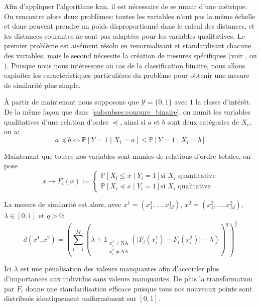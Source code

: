 Afin d'appliquer l'algorithme \ac{knn}, il est nécessaire de se munir d'une métrique. On rencontre alors deux problèmes: toutes les variables n'ont pas la même échelle et donc peuvent prendre un poids disproportionné dans le calcul des distances, et les distances courantes ne sont pas adaptées pour les variables qualitatives. Le premier problème est aisément résolu en renormalisant et standardisant chacune des variables, mais le second nécessite la création de mesures spécifiques (voir \citet{Wilson1997}, \citet{Lumijarvi2004} ou \citet{Rodriguez2008}). Puisque nous nous intéressons au cas de la classification binaire, nous allons exploiter les caractéristiques particulières du problème pour obtenir une mesure de similarité plus simple.

À partir de maintenant nous supposons que $\mathcal{Y} = \{0,1\}$ avec $1$ la classe d'intérêt. De la même façon que dans~\ref{subsubsec:coupure_binaire}, on munit les variables qualitatives d'une relation d'ordre $\preceq$, ainsi si $a$ et $b$ sont deux catégories de $X_i$, on a:
\begin{equation*}
    a \preceq b \Leftrightarrow \mathbb{P} \left[ Y = 1 \mid X_i = a \right] \leq \mathbb{P} \left[ Y = 1 \mid X_i = b \right]
\end{equation*}

Maintenant que toutes nos variables sont munies de relations d'ordre totales, on pose
\begin{equation*}
    x \rightarrow F_i(x) :=  \begin{cases}
        \mathbb{P} \left[ X_i \leq x \mid Y_i = 1 \right] \text{si } X_i \text{ quantitative} \\
        \mathbb{P} \left[ X_i \preceq x \mid Y_i = 1 \right] \text{si } X_i \text{ qualitative}
    \end{cases}
\end{equation*}

La mesure de similarité est alors, avec $x^1 = (x^1_1,\dotsc,x^1_M)$, $x^2 = (x^2_1,\dotsc,x^2_M)$, $\lambda \in [0,1]$ et $q>0$:
\begin{equation*}
    d(x^1,x^2) = \left( \sum_{i=1}^M \left( \lambda + \mathds{1}_{\substack{x^1_i \neq \mathrm{NA} \\ x^2_i \neq \mathrm{NA}}} ( \vert F_i (x^1_i) - F_i (x^2_i) \vert - \lambda )  \right)^q \right)^{\frac{1}{q}}
\end{equation*}

Ici $\lambda$ est une pénalisation des valeurs manquantes afin d'accorder plus d'importances aux individus sans valeurs manquantes. De plus la transformation par $F_i$ donne une standardisation efficace puisque tous nos nouveaux points sont distribués identiquement uniformément sur $[0,1]$.

